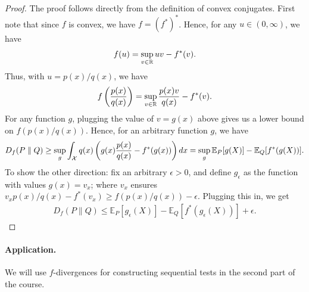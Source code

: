         \begin{proof}
            The proof follows directly from the definition of convex conjugates. First note that since $f$ is convex, we have $f = (f^*)^*$. Hence, for any $u \in (0, \infty)$, we have 
            \begin{align}
                f(u) = \sup_{v \in \mathbb{R}} u v - f^*(v). 
            \end{align}
            Thus, with $u= p(x)/q(x)$, we have 
            \begin{align}
                f\left( \frac{p(x)}{q(x)} \right) = \sup_{v \in \mathbb{R}} \frac{p(x) v}{q(x)} - f^*(v). 
            \end{align}
            For any function $g$, plugging the value of $v = g(x)$ above gives us a lower bound on $f(p(x)/q(x))$. Hence, for an arbitrary function $g$, we have 
            \begin{align}
                D_f(P \parallel Q) \geq \sup_{g } \int_{\mathcal{X}} q(x) \left( g(x) \frac{p(x)}{q(x)} - f^*(g(x)) \right) dx = \sup_{g} \mathbb{E}_P[g(X)]  - \mathbb{E}_Q[f^*(g(X))]. 
            \end{align}
            To show the other direction: fix an arbitrary $\epsilon >0$, and define $g_\epsilon$ as the function with values $g(x) = v_x$; where $v_x$ ensures $v_x p(x)/q(x)- f^*(v_x) \geq f(p(x)/q(x)) - \epsilon$. Plugging this in, we get 
            \begin{align}
                D_f(P \parallel Q)  \leq   \mathbb{E}_P[g_\epsilon(X)] - \mathbb{E}_Q[f^*(g_\epsilon(X))]  + \epsilon. 
            \end{align}
        \end{proof}


        \paragraph{Application.} We will use $f$-divergences for constructing sequential tests in the second part of the course. 
